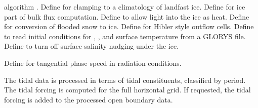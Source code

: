 \begin{klist}
\begin{klist}
\begin{klist}
	  algorithm \citep{Lemieux_2015}.
	 Define for clamping to a
	  climatology of landfast ice.
	 Define for ice part of bulk flux
	  computation.
	 Define to allow light into the ice as heat.
	 Define for conversion of flooded snow
 	  to ice.
	 Define for Hibler style outflow cells.
	 Define to read initial conditions
	  for , , and surface temperature from a
	  GLORYS file.
	 Define to turn off surface salinity
          nudging under the ice.
      \end{klist}
  \end{klist}
   \mbox{}
  \begin{klist}
       Define for tangential phase speed in
     radiation conditions.
  \end{klist}
   \mbox{}
The tidal data is processed in terms of tidal constituents, classified by
period. The tidal forcing is computed for the full horizontal grid.
If requested, the tidal forcing is added to the processed open
boundary data.


\end{klist}
